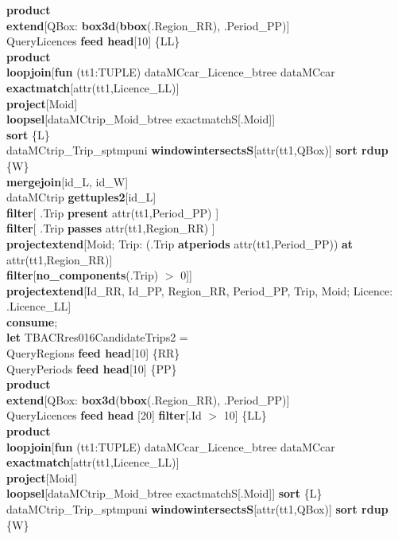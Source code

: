 \documentclass[a4paper]{article}
\newcommand{\op}[1]{\textbf{#1}}
\begin{document}
\begin{scriptsize}
\begin{tabbing}
\>\op{product}\\
\>\op{extend}[QBox: \op{box3d}(\op{bbox}(.Region\_RR), .Period\_PP)]\\
\>QueryLicences \op{feed head}[10] \{LL\}\\
\>\op{product}\\
\>\op{loopjoin}[\op{fun} (tt1:TUPLE) dataMCcar\_Licence\_btree dataMCcar \op{exactmatch}[attr(tt1,Licence\_LL)]\\
\>\>\op{project}[Moid]\\
\>\>\op{loopsel}[dataMCtrip\_Moid\_btree exactmatchS[.Moid]]\\
\>\>\op{sort} \{L\}\\
\>\>dataMCtrip\_Trip\_sptmpuni \op{windowintersectsS}[attr(tt1,QBox)] \op{sort rdup} \{W\}\\
\>\>\op{mergejoin}[id\_L, id\_W]\\
\>\>dataMCtrip \op{gettuples2}[id\_L]\\
\>\>\op{filter}[ .Trip \op{present} attr(tt1,Period\_PP) ]\\
\>\>\op{filter}[ .Trip \op{passes}  attr(tt1,Region\_RR) ]\\
\>\>\op{projectextend}[Moid; Trip: (.Trip \op{atperiods} attr(tt1,Period\_PP)) \op{at} attr(tt1,Region\_RR)]\\
\>\>\op{filter}[\op{no\_components}(.Trip) $>$ 0]]\\
\>\op{projectextend}[Id\_RR, Id\_PP, Region\_RR, Period\_PP, Trip, Moid; Licence: .Licence\_LL]\\
\op{consume};\\
\op{let} TBACRres016CandidateTrips2 =\\
\>QueryRegions \op{feed head}[10] \{RR\}\\
\>QueryPeriods \op{feed head}[10] \{PP\}\\
\>\op{product}\\
\>\op{extend}[QBox: \op{box3d}(\op{bbox}(.Region\_RR), .Period\_PP)]\\
\>QueryLicences \op{feed head} [20] \op{filter}[.Id $>$ 10] \{LL\}\\
\>\op{product}\\
\>\op{loopjoin}[\op{fun} (tt1:TUPLE) dataMCcar\_Licence\_btree dataMCcar \op{exactmatch}[attr(tt1,Licence\_LL)]\\
\>\>\op{project}[Moid]\\
\>\>\op{loopsel}[dataMCtrip\_Moid\_btree exactmatchS[.Moid]] \op{sort} \{L\}\\
\>\>dataMCtrip\_Trip\_sptmpuni \op{windowintersectsS}[attr(tt1,QBox)] \op{sort rdup} \{W\}\\

\end{tabbing}
\end{scriptsize}
\end{document}
